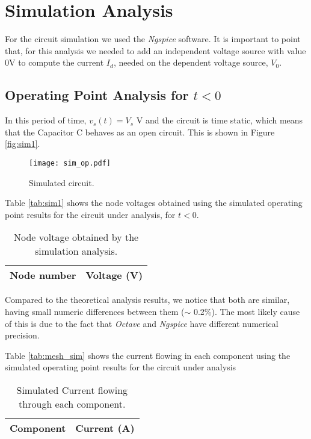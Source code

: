 \section{Simulation Analysis}
\label{sec:simulation}

For the circuit simulation we used the \textit{Ngspice} software. It is important to point that, for this analysis we needed to add an independent voltage source with value 0V to compute the current $I_d$, needed on the dependent voltage source, $V_0$.

\subsection{Operating Point Analysis for $t<0$}
\label{subsec:op_point}

In this period of time, $v_s (t)= V_s$ V and the circuit is time static, which means that the Capacitor C behaves as an open circuit. This is shown in Figure \ref{fig:sim1}.

\begin{figure}[H] \centering
\texttt{[image: sim\_op.pdf]}
\caption{Simulated circuit.}
\label{fig:sim_op}
\end{figure}

Table \ref{tab:sim1} shows the node voltages obtained using the simulated operating point results for the circuit under analysis, for $t<0$.
\begin{table}[H]
  \centering
  \begin{tabular}{|l|r|}
    \hline    
    {\bf Node number} & {\bf Voltage (V)} \\ \hline
    
  \end{tabular}
  \caption{Node voltage obtained by the simulation analysis.}
  \label{tab:sim_op_V}
\end{table}

Compared to the theoretical analysis results, we notice that both are similar, having small numeric differences between them ($\sim$ 0.2\%). The most likely cause of this is due to the fact that \textit{Octave} and \textit{Ngspice} have different numerical precision.

Table \ref{tab:mesh_sim} shows the current flowing in each component using the simulated operating point results for the circuit under analysis
\begin{table}[H]
  \centering
  \begin{tabular}{|l|r|}
    \hline    
    {\bf Component} & {\bf Current (A)} \\ \hline
    
  \end{tabular}
  \caption{Simulated Current flowing through each component.}
  \label{tab:sim_op_I}
\end{table}

